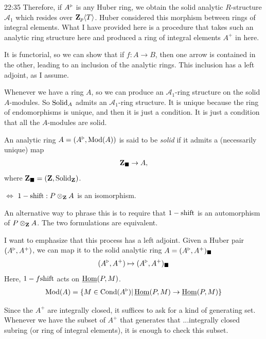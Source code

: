 \begin{unfinished}{22:35}
Therefore, if $A^\triangleright$ is any Huber ring, we obtain the solid analytic $R$-structure $\mathcal{A}_1$ which resides over $\mathbf Z_p\langle T \rangle$. 
Huber considered this morphism between rings of integral elements. 
What I have provided here is a procedure that takes such an analytic ring structure here and produced a ring of integral elements $A^+$ in here.


It is functorial, so we can show that if $f:A\to B$, then one arrow is contained in the other, leading to an inclusion of the analytic rings. 
This inclusion has a left adjoint, as I assume.

%
Whenever we have a ring $A$, so we can produce an $\mathcal{A}_1$-ring structure on the solid $A$-modules. So $\mathrm{Solid}_A$ admits an $\mathcal{A}_1$-ring structure. It is unique because the ring of endomorphisms is unique, and then it is just a condition. It is just a condition that all the $A$-modules are solid.

An analytic ring $A = (A^\triangleright, \operatorname{Mod}(A))$ is said to be \textit{solid} if it admits a (necessarily unique) map 
\begin{align*}
\mathbf Z_\blacksquare \to A,
\end{align*}
where $\mathbf Z_\blacksquare = (\mathbf Z, \mathrm{Solid}_\mathbf Z)$.

$\iff$ $1-\text{shift}: P \otimes_\mathbf Z A $ is an isomorphism. %
\ed

An alternative way to phrase this is to require that $1- \mathrm{shift}$ is an automorphism of $P \otimes_\mathbf Z A$. The two formulations are equivalent.

I want to emphasize that this process has a left adjoint. 
Given a Huber pair $(A^\triangleright, A^+)$, we can map it to the solid analytic ring $A = (A^\triangleright,A^+)_\blacksquare$
\begin{align*}
(A^\triangleright, A^+) \mapsto (A^\triangleright,A^{+})_\blacksquare
\end{align*}
Here, $1-f\mathrm{shift}$ acts on $\operatorname{\underline{Hom}}(P,M)$.
\begin{align*}
\operatorname{Mod}(A) = \{ M \in \mathrm{Cond}(A^\triangleright) | \operatorname{\underline{Hom}}(P,M) \to \operatorname{\underline{Hom}}(P,M) \}
\end{align*}



Since the $A^+$ are integrally closed, it suffices to ask for a kind of generating set.
Whenever we have the subset of $A^+$ that generates that ...integrally closed subring (or ring of integral elements), it is enough to check this subset.


\end{unfinished}
